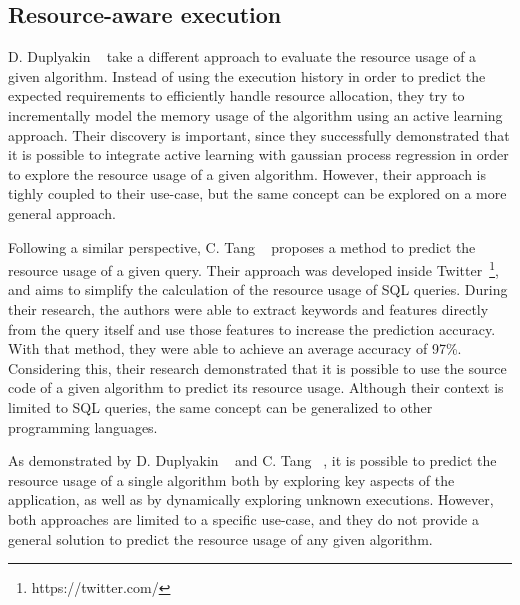 \subsection{Resource-aware execution}
\label{subsec:resource-aware-execution}

D. Duplyakin \etal~\cite{duplyakin2018} take a different approach to evaluate the resource usage of a given algorithm.
Instead of using the execution history in order to predict the expected requirements to efficiently handle resource allocation, they try to incrementally model the memory usage of the algorithm using an active learning approach.
Their discovery is important, since they successfully demonstrated that it is possible to integrate active learning with gaussian process regression in order to explore the resource usage of a given algorithm.
However, their approach is tighly coupled to their use-case, but the same concept can be explored on a more general approach.

Following a similar perspective, C. Tang \etal~\cite{tang2021} proposes a method to predict the resource usage of a given query.
Their approach was developed inside Twitter~\footnote{https://twitter.com/}, and aims to simplify the calculation of the resource usage of SQL queries.
During their research, the authors were able to extract keywords and features directly from the query itself and use those features to increase the prediction accuracy.
With that method, they were able to achieve an average accuracy of 97\%.
Considering this, their research demonstrated that it is possible to use the source code of a given algorithm to predict its resource usage.
Although their context is limited to SQL queries, the same concept can be generalized to other programming languages.

As demonstrated by D. Duplyakin \etal~\cite{duplyakin2018} and C. Tang \etal~\cite{tang2021}, it is possible to predict the resource usage of a single algorithm both by exploring key aspects of the application, as well as by dynamically exploring unknown executions.
However, both approaches are limited to a specific use-case, and they do not provide a general solution to predict the resource usage of any given algorithm.

